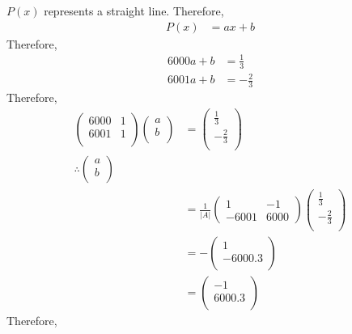 \documentclass[fleqn, a4paper, 12pt, twoside]{article}
\theoremstyle{definition}
\theoremstyle{theorem}
\begin{document}
\begin{solution}
	$P(x)$ represents a straight line.
	Therefore,
	\begin{align*}
		P(x) &= a x + b
	\end{align*}
	Therefore,
	\begin{align*}
		6000 a + b &= \frac{1}{3}\\
		6001 a + b &= -\frac{2}{3}
	\end{align*}
	Therefore,
	\begin{align*}
			\begin{pmatrix}
				6000 & 1\\
				6001 & 1\\
			\end{pmatrix}
			\begin{pmatrix}
				a\\
				b\\
			\end{pmatrix}
		&=
			\begin{pmatrix}
				\frac{1}{3}\\
				-\frac{2}{3}\\
			\end{pmatrix}\\
		\therefore
			\begin{pmatrix}
				a\\
				b\\
			\end{pmatrix}\\
		&=
			\frac{1}{|A|}
			\begin{pmatrix}
				1 & -1\\
				-6001 & 6000
			\end{pmatrix}
			\begin{pmatrix}
				\frac{1}{3}\\
				-\frac{2}{3}\\
			\end{pmatrix}\\
		&=
			-
			\begin{pmatrix}
				1\\
				-6000.3\\
			\end{pmatrix}\\
		&=
			\begin{pmatrix}
				-1\\
				6000.3\\
			\end{pmatrix}
	\end{align*}
	Therefore,
	\begin{align*}

\end{align*}
\end{solution}
\end{document}
